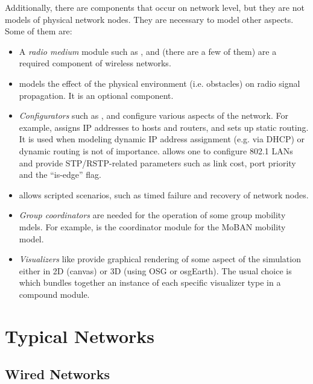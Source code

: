 Additionally, there are components that occur on network level, but they
are not models of physical network nodes. They are necessary
to model other aspects. Some of them are:

\begin{itemize}
  \item A \textit{radio medium} module such as ,
      and 
     (there are a few of them) are a required component of wireless networks.
  \item {} models the effect of the physical
     environment (i.e. obstacles) on radio signal propagation. It is an
     optional component.
  \item \textit{Configurators} such as ,
      and 
     configure various aspects of the network. For example,
      assigns IP addresses
     to hosts and routers, and sets up static routing. It is used
     when modeling dynamic IP address assignment (e.g. via DHCP) or
     dynamic routing is not of importance. 
     allows one to configure 802.1 LANs and provide STP/RSTP-related
     parameters such as link cost, port priority and the ``is-edge'' flag.
  \item {} allows scripted scenarios, such
     as timed failure and recovery of network nodes.
  \item \textit{Group coordinators} are needed for the operation of some
     group mobility mdels. For example,  is
     the coordinator module for the MoBAN mobility model.
  \item \textit{Visualizers} like  provide
     graphical rendering of some aspect of the simulation either in
     2D (canvas) or 3D (using OSG or osgEarth). The usual choice is
      which bundles together an instance
     of each specific visualizer type in a compound module.
\end{itemize}

\section{Typical Networks}
\label{sec:networks:typical-networks}

\subsection{Wired Networks}
\label{sec:networks:wired-networks}

